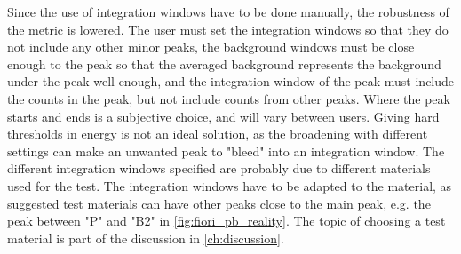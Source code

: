 Since the use of integration windows have to be done manually, the robustness of the metric is lowered.
The user must set the integration windows so that they do not include any other minor peaks, the background windows must be close enough to the peak so that the averaged background represents the background under the peak well enough, and the integration window of the peak must include the counts in the peak, but not include counts from other peaks.
Where the peak starts and ends is a subjective choice, and will vary between users.
Giving hard thresholds in energy is not an ideal solution, as the broadening with different settings can make an unwanted peak to "bleed" into an integration window.
The different integration windows specified are probably due to different materials used for the test.
The integration windows have to be adapted to the material, as suggested test materials can have other peaks close to the main peak, e.g. the peak between "P" and "B2" in \cref{fig:fiori_pb_reality}.
The topic of choosing a test material is part of the discussion in \cref{ch:discussion}.



